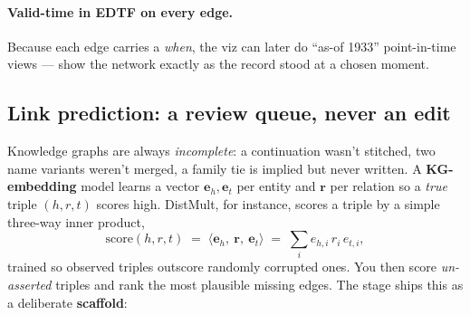 \documentclass[11pt]{article}
\newcommand{\code}[1]{\texttt{\small #1}}
\begin{document}
\begin{center}
\end{center}

\paragraph{Valid-time in EDTF on every edge.} Because each edge carries a \emph{when}, the viz can
later do ``as-of 1933'' point-in-time views --- show the network exactly as the record stood at a
chosen moment.

\subsection{Link prediction: a review queue, never an edit}

Knowledge graphs are always \emph{incomplete}: a continuation wasn't stitched, two name variants
weren't merged, a family tie is implied but never written. A \textbf{KG-embedding} model learns a
vector $\mathbf{e}_h, \mathbf{e}_t$ per entity and $\mathbf{r}$ per relation so a \emph{true} triple
$(h, r, t)$ scores high. DistMult, for instance, scores a triple by a simple three-way inner product,
\[
\mathrm{score}(h, r, t) \;=\; \langle \mathbf{e}_h,\ \mathbf{r},\ \mathbf{e}_t \rangle
\;=\; \sum_{i} e_{h,i}\, r_i\, e_{t,i},
\]
trained so observed triples outscore randomly corrupted ones. You then score \emph{un-asserted}
triples and rank the most plausible missing edges. The stage ships this as a deliberate
\textbf{scaffold}:
\end{document}
